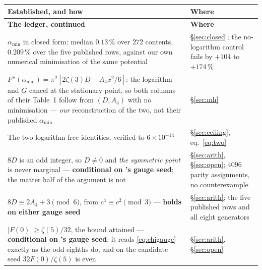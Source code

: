 \documentclass[11pt,a4paper]{article}
\newcommand{\amin}{\alpha_{\min}}
\begin{document}
\begingroup\footnotesize
\begin{longtable}{p{}p{}}
\toprule
\rowcolor{okgreen!12}\textbf{Established, and how} & \textbf{Where}\\
\midrule
\endfirsthead
\toprule
\textbf{The ledger, continued} & \textbf{Where}\\
\midrule
\endhead
$\amin$ in closed form: median $0.13\,\%$ over $272$ contents, $0.209\,\%$ over the five published
rows, against our own numerical minimisation of the same potential &
\S\ref{sec:closed}; the no-logarithm control fails by $+104$ to $+174\,\%$\\
$F''(\amin)=\pi^2[2\zeta(3)D-A_4x^2/6]$: the logarithm and $G$ cancel at the stationary point, so
both columns of their Table~1 follow from $(D,A_4)$ with no minimisation --- \emph{our}
reconstruction of the two, not their published $\amin$ &
\S\ref{sec:mh}\\
The two logarithm-free identities, verified to $6\times10^{-14}$ &
\S\ref{sec:ceiling}, eq.~\eqref{eq:two}\\
$8D$ is an odd integer, so $D\ne0$ and \emph{the symmetric point} is never marginal ---
\textbf{conditional on \cite{KM25}'s gauge seed}; the matter half of the argument is not &
\S\ref{sec:arith}, \S\ref{sec:open}; $4096$ parity assignments, no counterexample\\
$8D\equiv2A_4+3\pmod6$, from $c^4\equiv c^2\pmod3$ --- \textbf{holds on either gauge seed} &
\S\ref{sec:arith}; the five published rows and all eight generators\\
$|F(0)|\ge\zeta(5)/32$, the bound attained --- \textbf{conditional on \cite{KM25}'s gauge seed}:
it reads \eqref{eq:chigauge} exactly as the odd eighths do, and on the candidate seed
$32F(0)/\zeta(5)$ is even & \S\ref{sec:arith}, \S\ref{sec:open}\\

\end{longtable}
\end{document}
